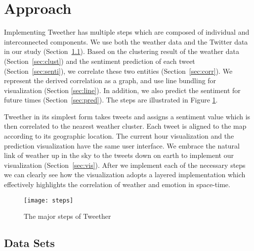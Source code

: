 \section{Approach}

Implementing Tweether has multiple steps which are composed of individual and interconnected components. We use both the weather data and the Twitter data in our study (Section~\ref{sec:dataset}). Based on the clustering result of the weather data (Section~\ref{sec:clust}) and the sentiment prediction of each tweet (Section~\ref{sec:senti}), we correlate these two entities (Section~\ref{sec:corr}). We represent the derived correlation as a graph, and use line bundling for visualization (Section \ref{sec:line}). In addition, we also predict the sentiment for future times (Section~\ref{sec:pred}). The steps are illustrated in Figure \ref{fig:steps}.



Tweether in its simplest form takes tweets and assigns a sentiment value which is then correlated to the nearest weather cluster. Each tweet is aligned to the map according to its geographic location. The current hour visualization and the prediction visualization have the same user interface. We embrace the natural link of weather up in the sky to the tweets down on earth to implement our visualization (Section~\ref{sec:vis}). After we implement each of the necessary steps we can clearly see how the visualization adopts a layered implementation which effectively highlights the correlation of weather and emotion in space-time.
\begin{figure}[t]
 \centering
 \texttt{[image: steps]}
 \caption{The major steps of Tweether}
 \label{fig:steps}
\end{figure}

\subsection{Data Sets}
\label{sec:dataset}

